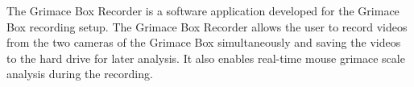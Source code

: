 The Grimace Box Recorder is a software application developed for the Grimace Box recording setup.
The Grimace Box Recorder allows the user to record videos from the two cameras of the Grimace Box simultaneously
and saving the videos to the hard drive for later analysis. It also enables real-time mouse grimace scale analysis
during the recording.